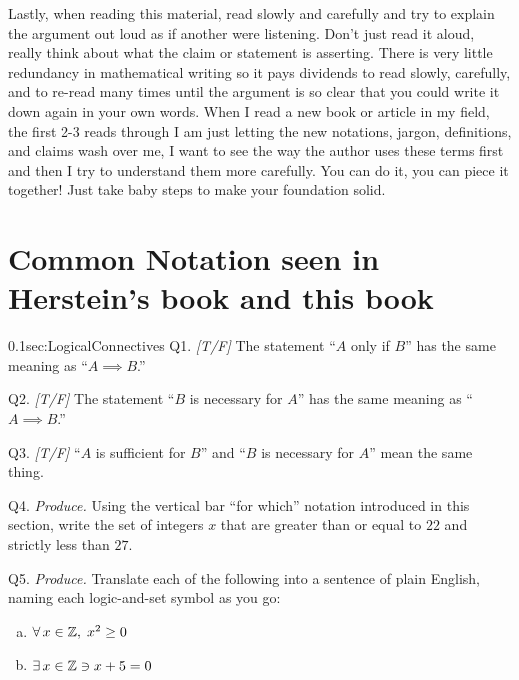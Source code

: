 \medskip
\noindent Lastly, when reading this material, read slowly and carefully and try to explain the argument out loud as if another were listening. Don't just read it aloud, really think about what the claim or statement is asserting. There is very little redundancy in mathematical writing so it pays dividends to read slowly, carefully, and to re-read many times until the argument is so clear that you could write it down again in your own words. When I read a new book or article in my field, the first 2-3 reads through I am just letting the new notations, jargon, definitions, and claims wash over me, I want to see the way the author uses these terms first and then I try to understand them more carefully. You can do it, you can piece it together! Just take baby steps to make your foundation solid. \newpage

\section{Common Notation seen in Herstein's book and this book}
\label{sec:CommonNotation}

\begin{selfcheckbox}{0.1}{sec:LogicalConnectives}
  \hypertarget{q:ch0:notation}{}
  Q1. \textit{[T/F]} The statement ``$A$ only if $B$'' has the same meaning as ``$A \implies B$.''\par\smallskip
  Q2. \textit{[T/F]} The statement ``$B$ is necessary for $A$'' has the same meaning as ``$A \implies B$.''\par\smallskip
  Q3. \textit{[T/F]} ``$A$ is sufficient for $B$'' and ``$B$ is necessary for $A$'' mean the same thing.\par\smallskip
  Q4. \textit{Produce.} Using the vertical bar ``for which'' notation introduced in this section, write the set of integers $x$ that are greater than or equal to $22$ and strictly less than $27$.\par\smallskip
  Q5. \textit{Produce.} Translate each of the following into a sentence of plain English, naming each logic-and-set symbol as you go:
  \begin{enumerate}[(a),topsep=2pt,itemsep=0pt]
    \item $\forall \, x \in {\mathbb{Z}}, \; x^2 \geq 0$
    \item $\exists \, x \in {\mathbb{Z}} \ni x + 5 = 0$
  \end{enumerate}
  \par\medskip\hfill{}
\end{selfcheckbox}

